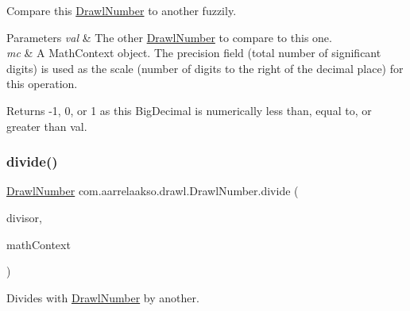 Compare this \hyperlink{classcom_1_1aarrelaakso_1_1drawl_1_1_drawl_number}{Drawl\+Number} to another fuzzily. 


\begin{DoxyParams}{Parameters}
{\em val} & The other \hyperlink{classcom_1_1aarrelaakso_1_1drawl_1_1_drawl_number}{Drawl\+Number} to compare to this one. \\
\hline
{\em mc} & A Math\+Context object. The precision field (total number of significant digits) is used as the scale (number of digits to the right of the decimal place) for this operation. \\
\hline
\end{DoxyParams}
\begin{DoxyReturn}{Returns}
-\/1, 0, or 1 as this Big\+Decimal is numerically less than, equal to, or greater than val. 
\end{DoxyReturn}
\mbox{\label{classcom_1_1aarrelaakso_1_1drawl_1_1_drawl_number_ac5c959677fa71d3303a9cb329f943cbc}} 
\subsubsection{\texorpdfstring{divide()}{divide()}\hspace{0.1cm}{\footnotesize\ttfamily [1/3]}}
{\footnotesize\ttfamily \hyperlink{classcom_1_1aarrelaakso_1_1drawl_1_1_drawl_number}{Drawl\+Number} com.\+aarrelaakso.\+drawl.\+Drawl\+Number.\+divide (\begin{DoxyParamCaption}\item[{@Not\+Null \hyperlink{classcom_1_1aarrelaakso_1_1drawl_1_1_drawl_number}{Drawl\+Number}}]{divisor,  }\item[{Math\+Context}]{math\+Context }\end{DoxyParamCaption})\hspace{0.3cm}{\ttfamily [protected]}}



Divides with \hyperlink{classcom_1_1aarrelaakso_1_1drawl_1_1_drawl_number}{Drawl\+Number} by another. 


